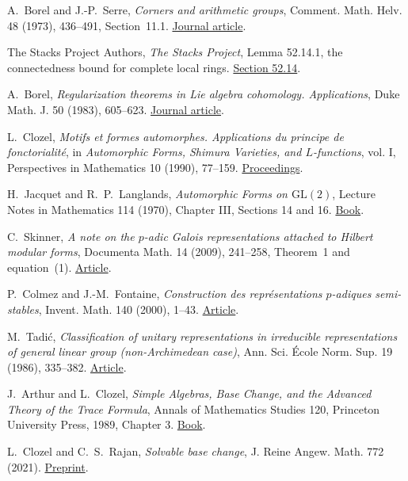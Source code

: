 A.~Borel and J.-P.~Serre, \emph{Corners and arithmetic groups},
Comment. Math. Helv. 48 (1973), 436--491, Section~11.1.
\href{https://doi.org/10.1007/BF02566134}{Journal article}.

The Stacks Project Authors, \emph{The Stacks Project},
Lemma 52.14.1, the connectedness bound for complete local rings.
\href{https://stacks.math.columbia.edu/tag/0ECQ}{Section 52.14}.

A.~Borel, \emph{Regularization theorems in Lie algebra cohomology.
Applications}, Duke Math. J. 50 (1983), 605--623.
\href{https://doi.org/10.1215/S0012-7094-83-05028-7}{Journal article}.

L.~Clozel, \emph{Motifs et formes automorphes.
Applications du principe de fonctorialit\'e},
in \emph{Automorphic Forms, Shimura Varieties, and \(L\)-functions},
vol. I, Perspectives in Mathematics 10 (1990), 77--159.
\href{https://www.jmilne.org/math/Books/AA1988a.pdf}{Proceedings}.

H.~Jacquet and R.~P.~Langlands,
\emph{Automorphic Forms on \(\mathrm{GL}(2)\)},
Lecture Notes in Mathematics 114 (1970), Chapter III, Sections 14 and 16.
\href{https://publications.ias.edu/node/60}{Book}.

C.~Skinner, \emph{A note on the \(p\)-adic Galois representations
attached to Hilbert modular forms}, Documenta Math. 14 (2009),
241--258, Theorem~1 and equation~(1).
\href{https://doi.org/10.4171/dm/272}{Article}.

P.~Colmez and J.-M.~Fontaine, \emph{Construction des repr\'esentations
\(p\)-adiques semi-stables}, Invent. Math. 140 (2000), 1--43.
\href{https://webusers.imj-prg.fr/~pierre.colmez/CF.pdf}{Article}.

M.~Tadi\'c, \emph{Classification of unitary representations in
irreducible representations of general linear group (non-Archimedean case)},
Ann. Sci. \'Ecole Norm. Sup. 19 (1986), 335--382.
\href{https://www.numdam.org/item/ASENS_1986_4_19_3_335_0/}{Article}.

J.~Arthur and L.~Clozel,
\emph{Simple Algebras, Base Change, and the Advanced Theory of the
Trace Formula}, Annals of Mathematics Studies 120,
Princeton University Press, 1989, Chapter 3.
\href{https://www.math.toronto.edu/arthur/pdf/30.pdf}{Book}.

L.~Clozel and C.~S.~Rajan,
\emph{Solvable base change}, J. Reine Angew. Math. 772 (2021).
\href{https://arxiv.org/abs/1806.02513}{Preprint}.

